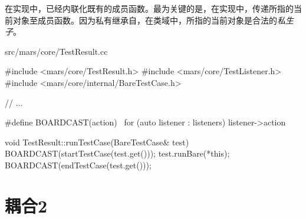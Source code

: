 \begin{content}
在实现中，已经内联化既有的成员函数。最为关键的是，在实现中，传递所指的当前对象至成员函数。因为私有继承自，在类域中，所指的当前对象是合法的\emph{私生子}。

\begin{nodiff}{src/mars/core/TestResult.cc}
 \begin{c++}
#include <mars/core/TestResult.h>
#include <mars/core/TestListener.h>
#include <mars/core/internal/BareTestCase.h>

// ...

#define BOARDCAST(action) \
  for (auto listener : listeners) listener->action

void TestResult::runTestCase(BareTestCase& test) {
  BOARDCAST(startTestCase(test.get()));
  test.runBare(*this);
  BOARDCAST(endTestCase(test.get()));
}
 \end{c++}
\end{nodiff}

\end{content}

\section{耦合2}

